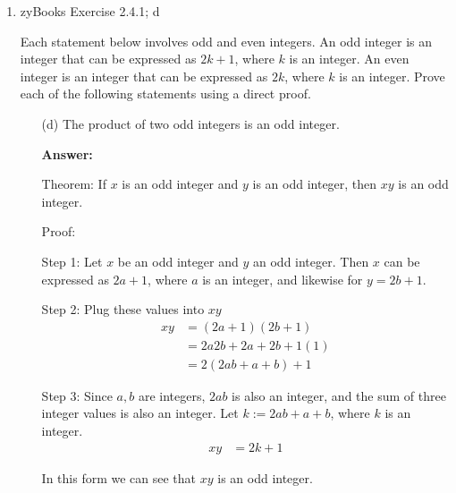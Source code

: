 \documentclass[14pt]{extreport}
\newcommand{\answer}[0]{\medskip \textbf{Answer:} \medskip}
\begin{document}
\begin{enumerate}
    
    \item zyBooks Exercise 2.4.1; d
    
    Each statement below involves odd and even integers. An odd integer is an integer that can be expressed as \( 2k + 1 \), where \( k \) is an integer. An even integer is an integer that can be expressed as \( 2k \), where \( k \) is an integer. Prove each of the following statements using a direct proof.
    
        \begin{enumerate}
            
            \item[(d)] The product of two odd integers is an odd integer.
            
                \answer

                Theorem: If \( x \) is an odd integer and \( y \) is an odd integer, then \( xy \) is an odd integer.

                \medskip

                Proof:

                Step 1: Let \( x \) be an odd integer and \( y \) an odd integer. Then \( x \) can be expressed as \( 2a + 1 \), where \( a \) is an integer, and likewise for \( y = 2b + 1 \).

                \medskip

                Step 2: Plug these values into \( xy \)
                \begin{align*}
                    xy &= (2a + 1)(2b + 1) \\
                       &= 2a2b + 2a + 2b + 1(1) \\
                       &= 2(2ab + a + b) + 1
                \end{align*}

                \medskip

                Step 3: Since \( a, b \) are integers, \( 2ab \) is also an integer, and the sum of three integer values is also an integer. Let \( k := 2ab + a + b \), where \( k \) is an integer.
                \begin{align*}
                    xy &= 2k + 1
                \end{align*}

                In this form we can see that \( xy \) is an odd integer.
            
        \end{enumerate}


\end{enumerate}
\end{document}
